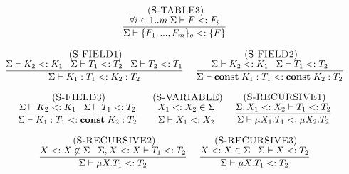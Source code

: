 \begin{figure}[!ht]
\begin{footnotesize}
$$\begin{array}{c}
\begin{array}{c}
\mylabel{S-TABLE3}\\
\dfrac{\forall i \in 1..m \; \senv \vdash F \subtype F_{i}}
      {\senv \vdash \{F_{1}, ..., F_{m}\}_{o} \subtype \{F\}} 
\end{array}
\\ \\
\begin{array}{c}
\mylabel{S-FIELD1}\\
\dfrac{\senv \vdash K_{2} \subtype K_{1} \;\;\;
       \senv \vdash T_{1} \subtype T_{2} \;\;\;
       \senv \vdash T_{2} \subtype T_{1}}
      {\senv \vdash K_{1}:T_{1} \subtype K_{2}:T_{2}}
\end{array}
\;
\begin{array}{c}
\mylabel{S-FIELD2}\\
\dfrac{\senv \vdash K_{2} \subtype K_{1} \;\;\;
       \senv \vdash T_{1} \subtype T_{2}}
      {\senv \vdash \Const \; K_{1}:T_{1} \subtype \Const \; K_{2}:T_{2}}
\end{array}
\\ \\
\begin{array}{c}
\mylabel{S-FIELD3}\\
\dfrac{\senv \vdash K_{2} \subtype K_{1} \;\;\;
       \senv \vdash T_{1} \subtype T_{2}}
      {\senv \vdash K_{1}:T_{1} \subtype \Const \; K_{2}:T_{2}}
\end{array}
\;
\begin{array}{c}
\mylabel{S-VARIABLE}\\
\dfrac{X_{1} \subtype X_{2} \in \senv}
      {\senv \vdash X_{1} \subtype X_{2}}
\end{array}
\;
\begin{array}{c}
\mylabel{S-RECURSIVE1}\\
\dfrac{\senv, X_{1} \subtype X_{2} \vdash T_{1} \subtype T_{2}}
      {\senv \vdash \mu X_{1}.T_{1} \subtype \mu X_{2}.T_{2}}
\end{array}
\\ \\
\begin{array}{c}
\mylabel{S-RECURSIVE2}\\
\dfrac{X \subtype X \not\in \senv \;\;\;
      \senv, X \subtype X \vdash T_{1} \subtype T_{2}}
      {\senv \vdash \mu X.T_{1} \subtype T_{2}}
\end{array}
\;
\begin{array}{c}
\mylabel{S-RECURSIVE3}\\
\dfrac{X \subtype X \in \senv \;\;\;
       \senv \vdash X \subtype T_{2}}
      {\senv \vdash \mu X.T_{1} \subtype T_{2}}

\end{array}
\end{array}$$
\end{footnotesize}
\end{figure}
